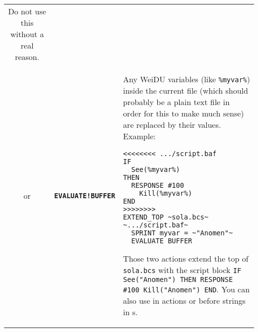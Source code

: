 \documentclass{article}
\def\ttref#1{\ahrefloc{#1}{\tt #1}}
\def\DEFINE#1{{\tt \bf #1}\label{#1}\index{#1}}
\def\t#1{{\tt #1}}
\begin{document}
\begin{tabular}{cp{10in}|p{10in}}
	Do not use this without a real reason.
\\
or & \DEFINE{EVALUATE!BUFFER} &
  Any WeiDU variables (like \t{\%myvar\%}) inside the current file (which
  should probably be a plain text file in order for this to make much sense)
  are replaced by their values. Example:
\begin{verbatim}
<<<<<<<< .../script.baf
IF
  See(%myvar%)
THEN
  RESPONSE #100
    Kill(%myvar%)
END
>>>>>>>>
EXTEND_TOP ~sola.bcs~ ~.../script.baf~
  SPRINT myvar = ~"Anomen"~
  EVALUATE_BUFFER
\end{verbatim}
  Those two actions extend the top of \t{sola.bcs} with the script
  block \t{IF See("Anomen") THEN RESPONSE \#100 Kill("Anomen") END}.
  You can also use \ttref{EVALUATE!BUFFER} in \ttref{COMPILE} actions
  or before strings in \ttref{value}s.
  \\


\end{tabular}
\end{document}
